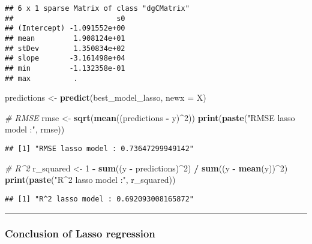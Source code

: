 \documentclass[
]{article}
\newenvironment{Shaded}{\begin{snugshade}}{\end{snugshade}}
\newcommand{\AttributeTok}[1]{\textcolor[rgb]{0.13,0.29,0.53}{#1}}
\newcommand{\CommentTok}[1]{\textcolor[rgb]{0.56,0.35,0.01}{\textit{#1}}}
\newcommand{\DecValTok}[1]{\textcolor[rgb]{0.00,0.00,0.81}{#1}}
\newcommand{\FunctionTok}[1]{\textcolor[rgb]{0.13,0.29,0.53}{\textbf{#1}}}
\newcommand{\NormalTok}[1]{#1}
\newcommand{\OtherTok}[1]{\textcolor[rgb]{0.56,0.35,0.01}{#1}}
\newcommand{\SpecialCharTok}[1]{\textcolor[rgb]{0.81,0.36,0.00}{\textbf{#1}}}
\newcommand{\StringTok}[1]{\textcolor[rgb]{0.31,0.60,0.02}{#1}}
\begin{document}
\begin{verbatim}
## 6 x 1 sparse Matrix of class "dgCMatrix"
##                        s0
## (Intercept) -1.091552e+00
## mean         1.908124e+01
## stDev        1.350834e+02
## slope       -3.161498e+04
## min         -1.132358e-01
## max          .
\end{verbatim}

\begin{Shaded}
\begin{Highlighting}[]
\NormalTok{predictions }\OtherTok{\textless{}{-}} \FunctionTok{predict}\NormalTok{(best\_model\_lasso, }\AttributeTok{newx =}\NormalTok{ X)}

\CommentTok{\# RMSE}
\NormalTok{rmse }\OtherTok{\textless{}{-}} \FunctionTok{sqrt}\NormalTok{(}\FunctionTok{mean}\NormalTok{((predictions }\SpecialCharTok{{-}}\NormalTok{ y)}\SpecialCharTok{\^{}}\DecValTok{2}\NormalTok{)) }
\FunctionTok{print}\NormalTok{(}\FunctionTok{paste}\NormalTok{(}\StringTok{"RMSE lasso model :"}\NormalTok{, rmse))}
\end{Highlighting}
\end{Shaded}

\begin{verbatim}
## [1] "RMSE lasso model : 0.73647299949142"
\end{verbatim}

\begin{Shaded}
\begin{Highlighting}[]
\CommentTok{\# R\^{}2}
\NormalTok{r\_squared }\OtherTok{\textless{}{-}} \DecValTok{1} \SpecialCharTok{{-}} \FunctionTok{sum}\NormalTok{((y }\SpecialCharTok{{-}}\NormalTok{ predictions)}\SpecialCharTok{\^{}}\DecValTok{2}\NormalTok{) }\SpecialCharTok{/} \FunctionTok{sum}\NormalTok{((y }\SpecialCharTok{{-}} \FunctionTok{mean}\NormalTok{(y))}\SpecialCharTok{\^{}}\DecValTok{2}\NormalTok{)}
\FunctionTok{print}\NormalTok{(}\FunctionTok{paste}\NormalTok{(}\StringTok{"R\^{}2 lasso model :"}\NormalTok{, r\_squared))}
\end{Highlighting}
\end{Shaded}

\begin{verbatim}
## [1] "R^2 lasso model : 0.692093008165872"
\end{verbatim}

\begin{center}\rule{0.5\linewidth}{0.5pt}\end{center}

\subsubsection{Conclusion of Lasso
regression}\label{conclusion-of-lasso-regression}
\end{document}
